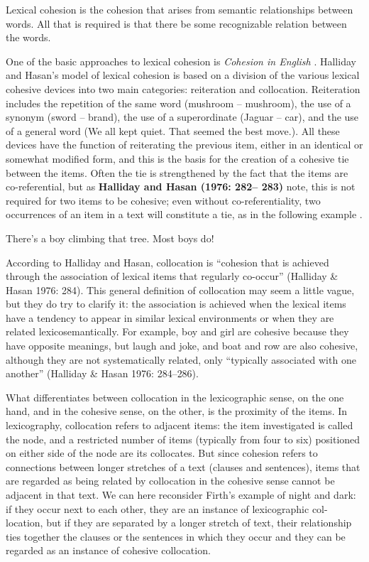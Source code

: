 Lexical cohesion is the cohesion that arises from semantic relationships between words. 
All that is required is that there be some recognizable relation between the words.
 
One of the basic approaches to lexical cohesion is \emph{Cohesion in English} \cite{halliday76}. 
Halliday and Hasan’s model of lexical cohesion is based on a division of the various lexical cohesive devices into two main categories: reiteration and collocation. 
Reiteration includes the repetition of the same word (mushroom – mushroom), the use of a synonym (sword – brand), the use of a superordinate (Jaguar – car), and the use of a general word (We all kept quiet. That seemed the best move.). 
All these devices have the function of reiterating the previous item, either in an identical or somewhat modified form, and this is the basis for the creation of a cohesive tie between the items.
Often the tie is strengthened by the fact that the items are co-referential, but as  \textbf{Halliday and Hasan (1976: 282– 283)} note, this is not required for two items to be cohesive; even without co-referentiality, two occurrences of an item in a text will constitute a tie, as in the following example .

There’s a boy climbing that tree. Most boys do!

According to Halliday and Hasan, collocation is ``cohesion that is achieved through the association of lexical items that regularly co-occur'' (Halliday \& Hasan 1976: 284). 
This general definition of collocation may seem a little vague, but they do try to clarify it: the association is achieved when the lexical items have a tendency to appear in similar lexical environments or when they are related lexicosemantically. 
For example, boy and girl are cohesive because they have opposite meanings, but laugh and joke, and boat and row are also cohesive, although they are not systematically related, only ``typically associated with one another'' (Halliday \& Hasan 1976: 284–286).

What differentiates between collocation in the lexicographic sense, on the one hand, and in the cohesive sense, on the other, is the proximity of the items. In lexicography, collocation refers to adjacent items: the item investigated is called the node, and a restricted number of items (typically from four to six) positioned on either side of the node are its collocates. But since cohesion refers to connections between longer stretches of a text (clauses and sentences), items that are regarded as being related by collocation in the cohesive sense cannot be adjacent in that text. We can here reconsider Firth’s example of night and dark: if they occur next to each other, they are an instance of lexicographic col- location, but if they are separated by a longer stretch of text, their relationship ties together the clauses or the sentences in which they occur and they can be regarded as an instance of cohesive collocation.

